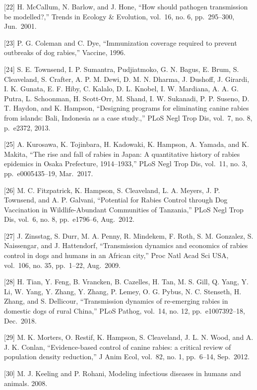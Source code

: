 \documentclass[
  oneside]{book}
\begin{document}
{[}22{]} H. McCallum, N. Barlow, and J. Hone, ``How should pathogen transmission be modelled?,'' Trends in Ecology \& Evolution, vol.~16, no. 6, pp.~295--300, Jun.~2001.

{[}23{]} P. G. Coleman and C. Dye, ``Immunization coverage required to prevent outbreaks of dog rabies,'' Vaccine, 1996.

{[}24{]} S. E. Townsend, I. P. Sumantra, Pudjiatmoko, G. N. Bagus, E. Brum, S. Cleaveland, S. Crafter, A. P. M. Dewi, D. M. N. Dharma, J. Dushoff, J. Girardi, I. K. Gunata, E. F. Hiby, C. Kalalo, D. L. Knobel, I. W. Mardiana, A. A. G. Putra, L. Schoonman, H. Scott-Orr, M. Shand, I. W. Sukanadi, P. P. Suseno, D. T. Haydon, and K. Hampson, ``Designing programs for eliminating canine rabies from islands: Bali, Indonesia as a case study.,'' PLoS Negl Trop Dis, vol.~7, no. 8, p.~e2372, 2013.

{[}25{]} A. Kurosawa, K. Tojinbara, H. Kadowaki, K. Hampson, A. Yamada, and K. Makita, ``The rise and fall of rabies in Japan: A quantitative history of rabies epidemics in Osaka Prefecture, 1914--1933,'' PLoS Negl Trop Dis, vol.~11, no. 3, pp.~e0005435--19, Mar.~2017.

{[}26{]} M. C. Fitzpatrick, K. Hampson, S. Cleaveland, L. A. Meyers, J. P. Townsend, and A. P. Galvani, ``Potential for Rabies Control through Dog Vaccination in Wildlife-Abundant Communities of Tanzania,'' PLoS Negl Trop Dis, vol.~6, no. 8, pp.~e1796--6, Aug.~2012.

{[}27{]} J. Zinsstag, S. Durr, M. A. Penny, R. Mindekem, F. Roth, S. M. Gonzalez, S. Naissengar, and J. Hattendorf, ``Transmission dynamics and economics of rabies control in dogs and humans in an African city,'' Proc Natl Acad Sci USA, vol.~106, no. 35, pp.~1--22, Aug.~2009.

{[}28{]} H. Tian, Y. Feng, B. Vrancken, B. Cazelles, H. Tan, M. S. Gill, Q. Yang, Y. Li, W. Yang, Y. Zhang, Y. Zhang, P. Lemey, O. G. Pybus, N. C. Stenseth, H. Zhang, and S. Dellicour, ``Transmission dynamics of re-emerging rabies in domestic dogs of rural China,'' PLoS Pathog, vol.~14, no. 12, pp.~e1007392--18, Dec.~2018.

{[}29{]} M. K. Morters, O. Restif, K. Hampson, S. Cleaveland, J. L. N. Wood, and A. J. K. Conlan, ``Evidence-based control of canine rabies: a critical review of population density reduction,'' J Anim Ecol, vol.~82, no. 1, pp.~6--14, Sep.~2012.

{[}30{]} M. J. Keeling and P. Rohani, Modeling infectious diseases in humans and animals. 2008.
\end{document}

